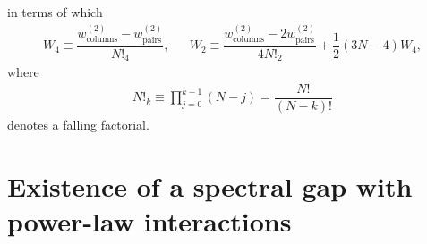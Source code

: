 \documentclass[nofootinbib,notitlepage,11pt]{revtex4-2}
\renewcommand{\t}{\text} %
\newcommand{\f}[2]{\dfrac{#1}{#2}} %
\newcommand{\p}[1]{\left(#1\right)} %
\newcommand{\1}{\mathds{1}}
\begin{document}
in terms of which
\begin{align}
  W_4 \equiv \f{w_{\t{columns}}^{(2)} - w_{\t{pairs}}^{(2)}}{N!_4},
  &&
  W_2 \equiv \f{w_{\t{columns}}^{(2)} - 2 w_{\t{pairs}}^{(2)}}
  {4N!_2} + \f12 \p{3N-4} W_4,
\end{align}
where
\begin{align}
  N!_k \equiv \prod_{j=0}^{k-1} \p{N-j} = \f{N!}{\p{N-k}!}
\end{align}
denotes a falling factorial.

\newpage
\appendix

\section{Existence of a spectral gap with power-law interactions}
\label{sec:spectral_gap}
\end{document}

